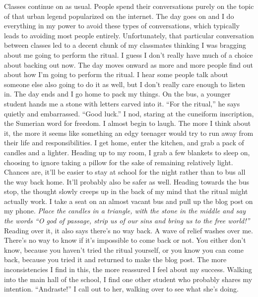 \documentclass[a4paper, 12pt]{book}
\newcommand\tab[1][1cm]{\hspace*{#1}}
\begin{document}
\newline
\tab
Classes continue on as usual. People spend their conversations purely on the topic of that urban legend popularized on the internet. The day goes on and I do everything in my power to avoid these types of conversations, which typically leads to avoiding most people entirely. Unfortunately, that particular conversation between classes led to a decent chunk of my classmates thinking I was bragging about me going to perform the ritual. I guess I don’t really have much of a choice about backing out now.
\newline
\tab
The day moves onward as more and more people find out about how I’m going to perform the ritual. I hear some people talk about someone else also going to do it as well, but I don’t really care enough to listen in. The day ends and I go home to pack my things. On the bus, a younger student hands me a stone with letters carved into it. “For the ritual,” he says quietly and embarrassed. “Good luck.” I nod, staring at the cuneiform inscription, \textcuneiform{\AmaGi} the Sumerian word for freedom. I almost begin to laugh. The more I think about it, the more it seems like something an edgy teenager would try to run away from their life and responsibilities.
\newline
\tab
I get home, enter the kitchen, and grab a pack of candles and a lighter. Heading up to my room, I grab a few blankets to sleep on, choosing to ignore taking a pillow for the sake of remaining relatively light. Chances are, it’ll be easier to stay at school for the night rather than to bus all the way back home. It’ll probably also be safer as well. Heading towards the bus stop, the thought slowly creeps up in the back of my mind that the ritual might actually work. I take a seat on an almost vacant bus and pull up the blog post on my phone. 
\newline
\tab
\textit{
Place the candles in a triangle, with the stone in the middle and say the words “O god of passage, strip us of our sins and bring us to the free world!” 
}
\newline
\tab
Reading over it, it also says there’s no way back. A wave of relief washes over me. There’s no way to know if it’s impossible to come back or not. You either don’t know, because you haven’t tried the ritual yourself, or you know you can come back, because you tried it and returned to make the blog post. The more inconsistencies I find in this, the more reassured I feel about my success.
\newline
\tab
Walking into the main hall of the school, I find one other student who probably shares my intention. “Andraste!” I call out to her, walking over to see what she’s doing.
\end{document}
